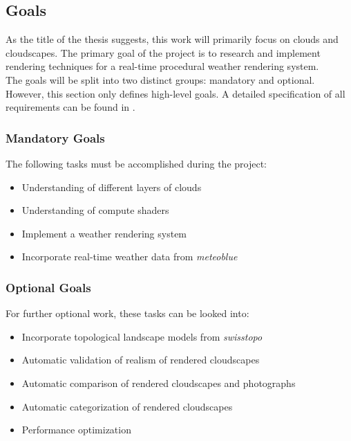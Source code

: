  \subsection{Goals}
\label{section:goals}
As the title of the thesis suggests, this work will primarily focus on clouds and cloudscapes.
The primary goal of the project is to research and implement rendering techniques for a real-time \gls{procedural} weather rendering system.
\\
The goals will be split into two distinct groups: mandatory and optional. However, this section only defines high-level goals. A detailed specification of all requirements can be found in .

\subsubsection{Mandatory Goals}
The following tasks must be accomplished during the project:
\begin{itemize}
    \item Understanding of different layers of clouds
    \item Understanding of compute shaders
    \item Implement a weather rendering system
    \item Incorporate real-time weather data from \emph{meteoblue}
\end{itemize}

\subsubsection{Optional Goals}
For further optional work, these tasks can be looked into:
\begin{itemize}
    \item Incorporate topological landscape models from \emph{swisstopo}
    \item Automatic validation of realism of rendered cloudscapes
    \item Automatic comparison of rendered cloudscapes and photographs
    \item Automatic categorization of rendered cloudscapes
    \item Performance optimization
\end{itemize}

\clearpage

